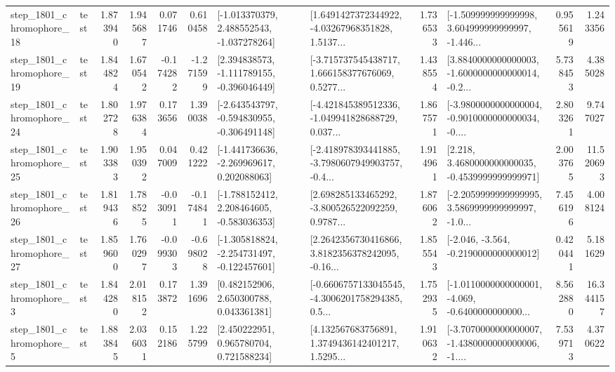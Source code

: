 \begin{tabular}{llrrrrllrlrr}
 step\_1801\_chromophore\_18 &      test &      1.873940 &    1.945687 &      0.071746 &  0.610458 &   [-1.013370379, 2.488552543, -1.037278264] &  [1.6491427372344922, -4.03267968351828, 1.5137... &       1.736533 &  [-1.509999999999998, 3.604999999999997, -1.446... &            0.955619 &          1.243356 \\
 step\_1801\_chromophore\_19 &      test &      1.844824 &    1.670542 &     -0.174282 & -1.271599 &   [2.394838573, -1.111789155, -0.396046449] &  [-3.715737545438717, 1.666158377676069, 0.5277... &       1.438554 &  [3.8840000000000003, -1.6000000000000014, -0.2... &            5.738453 &          4.385028 \\
 step\_1801\_chromophore\_24 &      test &      1.802728 &    1.976384 &      0.173656 &  1.390038 &  [-2.643543797, -0.594830955, -0.306491148] &  [-4.421845389512336, -1.049941828688729, 0.037... &       1.867571 &  [-3.9800000000000004, -0.9010000000000034, -0.... &            2.803261 &          9.747027 \\
 step\_1801\_chromophore\_25 &      test &      1.903383 &    1.950392 &      0.047009 &  0.421222 &   [-1.441736636, -2.269969617, 0.202088063] &  [-2.418978393441885, -3.7980607949903757, -0.4... &       1.914961 &   [2.218, 3.4680000000000035, -0.4539999999999971] &            2.003765 &         11.520693 \\
 step\_1801\_chromophore\_26 &      test &      1.819436 &    1.788525 &     -0.030911 & -0.174841 &   [-1.788152412, 2.208464605, -0.583036353] &  [2.698285133465292, -3.800526522092259, 0.9787... &       1.876062 &  [-2.2059999999999995, 3.5869999999999997, -1.0... &            7.456196 &          4.008124 \\
 step\_1801\_chromophore\_27 &      test &      1.859600 &    1.760297 &     -0.099303 & -0.698028 &  [-1.305818824, -2.254731497, -0.122457601] &  [2.2642356730416866, 3.8182356378242095, -0.16... &       1.855543 &              [-2.046, -3.564, -0.2190000000000012] &            0.420441 &          5.181629 \\
  step\_1801\_chromophore\_3 &      test &      1.844280 &    2.018152 &      0.173872 &  1.391696 &     [0.482152906, 2.650300788, 0.043361381] &  [-0.6606757133045545, -4.3006201758294385, 0.5... &       1.752935 &  [-1.0110000000000001, -4.069, -0.6400000000000... &            8.562880 &         16.344157 \\
  step\_1801\_chromophore\_5 &      test &      1.883845 &    2.036031 &      0.152186 &  1.225799 &     [2.450222951, 0.965780704, 0.721588234] &  [4.132567683756891, 1.3749436142401217, 1.5295... &       1.910632 &  [-3.7070000000000007, -1.4380000000000006, -1.... &            7.539713 &          4.370622 \\

\end{tabular}

